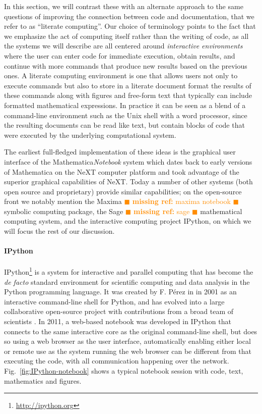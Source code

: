 \documentclass[ChapterTOCs,krantz2]{krantz} %
\newcommand{\mref}[1] { \textcolor{darkorange} {
\ensuremath{\blacksquare} {\bf missing ref:}  {#1}
\ensuremath{\blacksquare} } }
\begin{document}
In this section, we will contrast these with an alternate approach to the same
questions of improving the connection between code and documentation, that we
refer to as ``literate computing''.  Our choice of terminology points to the
fact that we emphasize the act of computing itself rather than the writing of
code, as all the systems we will describe are all centered around
\emph{interactive environments} where the user can enter code for immediate
execution, obtain results, and continue with more commands that produce new
results based on the previous ones.  A literate computing environment is one
that allows users not only to execute commands but also to store in a literate
document format the results of these commands along with figures and free-form
text that typically can include formatted mathematical expressions.  In
practice it can be seen as a blend of a command-line environment such as the
Unix shell with a word processor, since the resulting documents can be read
like text, but contain blocks of code that were executed by the underlying
computational system.

The earliest full-fledged implementation of these ideas is the graphical user
interface of the Mathematica\textregistered \emph{Notebook} system which dates
back to early versions of Mathematica on the NeXT computer platform and took
advantage of the superior graphical capabilities of NeXT.  Today a number of
other systems (both open source and proprietary) provide similar capabilities;
on the open-source front we notably mention the Maxima \mref{maxima notebook}
symbolic computing package, the Sage \mref{sage} mathematical computing system,
and the interactive computing project IPython, on which we will focus the rest
of our discussion.

\paragraph{ {\bf IPython}}

IPython\footnote{\url{http://ipython.org}} is a system for interactive and
parallel computing that has become the \emph{de facto} standard environment for
scientific computing and data analysis in the Python programming language.  It
was created by F. P\'erez in in 2001 as an interactive command-line shell for
Python, and has evolved into a large collaborative open-source project with
contributions from a broad team of scientists \cite{PER-GRA:2007}.  In 2011, a
web-based notebook was developed in IPython that connects to the same
interactive core as the original command-line shell, but does so using a web
browser as the user interface, automatically enabling either local or remote
use as the system running the web browser can be different from that executing
the code, with all communication happening over the network.
Fig.~\ref{fig:IPython-notebook} shows a typical notebook session with code,
text, mathematics and figures.
\end{document}
